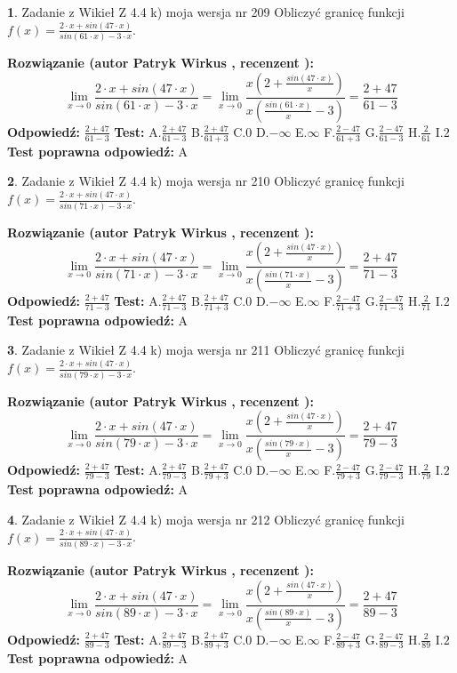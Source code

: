 \documentclass[12pt, a4paper]{article}
\theoremstyle{definition} %
\newtheorem{zad}{}
\newcommand{\zadStart}[1]{\begin{zad}#1\newline}
\newcommand{\zadStop}{\end{zad}}
\newcommand{\rozwStart}[2]{\noindent \textbf{Rozwiązanie (autor #1 , recenzent #2): }\newline}
\newcommand{\rozwStop}{\newline}
\newcommand{\odpStart}{\noindent \textbf{Odpowiedź:}\newline}
\newcommand{\odpStop}{\newline}
\newcommand{\testStart}{\noindent \textbf{Test:}\newline}
\newcommand{\testStop}{\newline}
\newcommand{\kluczStart}{\noindent \textbf{Test poprawna odpowiedź:}\newline}
\newcommand{\kluczStop}{\newline}
\begin{document}
\zadStart{Zadanie z Wikieł Z 4.4 k) moja wersja nr 209}
Obliczyć granicę funkcji $f(x)=\frac{2\cdot x +sin(47\cdot x)}{sin(61\cdot x) -3\cdot x}$.
\zadStop
\rozwStart{Patryk Wirkus}{}
$$\lim\limits_{x\to 0}\frac{2\cdot x +sin(47\cdot x)}{sin(61\cdot x) -3\cdot x}
=\lim\limits_{x\to 0}\frac{x(2+\frac{sin(47\cdot x)}{x})}{x(\frac{sin(61\cdot x)}{x}-3)}
=\frac{2+47}{61-3}$$
\rozwStop
\odpStart
$\frac{2+47}{61-3}$
\odpStop
\testStart
A.$\frac{2+47}{61-3}$
B.$\frac{2+47}{61+3}$
C.$0$
D.$-\infty$
E.$\infty$
F.$\frac{2-47}{61+3}$
G.$\frac{2-47}{61-3}$
H.$\frac{2}{61}$
I.$2$
\testStop
\kluczStart
A
\kluczStop



\zadStart{Zadanie z Wikieł Z 4.4 k) moja wersja nr 210}
Obliczyć granicę funkcji $f(x)=\frac{2\cdot x +sin(47\cdot x)}{sin(71\cdot x) -3\cdot x}$.
\zadStop
\rozwStart{Patryk Wirkus}{}
$$\lim\limits_{x\to 0}\frac{2\cdot x +sin(47\cdot x)}{sin(71\cdot x) -3\cdot x}
=\lim\limits_{x\to 0}\frac{x(2+\frac{sin(47\cdot x)}{x})}{x(\frac{sin(71\cdot x)}{x}-3)}
=\frac{2+47}{71-3}$$
\rozwStop
\odpStart
$\frac{2+47}{71-3}$
\odpStop
\testStart
A.$\frac{2+47}{71-3}$
B.$\frac{2+47}{71+3}$
C.$0$
D.$-\infty$
E.$\infty$
F.$\frac{2-47}{71+3}$
G.$\frac{2-47}{71-3}$
H.$\frac{2}{71}$
I.$2$
\testStop
\kluczStart
A
\kluczStop



\zadStart{Zadanie z Wikieł Z 4.4 k) moja wersja nr 211}
Obliczyć granicę funkcji $f(x)=\frac{2\cdot x +sin(47\cdot x)}{sin(79\cdot x) -3\cdot x}$.
\zadStop
\rozwStart{Patryk Wirkus}{}
$$\lim\limits_{x\to 0}\frac{2\cdot x +sin(47\cdot x)}{sin(79\cdot x) -3\cdot x}
=\lim\limits_{x\to 0}\frac{x(2+\frac{sin(47\cdot x)}{x})}{x(\frac{sin(79\cdot x)}{x}-3)}
=\frac{2+47}{79-3}$$
\rozwStop
\odpStart
$\frac{2+47}{79-3}$
\odpStop
\testStart
A.$\frac{2+47}{79-3}$
B.$\frac{2+47}{79+3}$
C.$0$
D.$-\infty$
E.$\infty$
F.$\frac{2-47}{79+3}$
G.$\frac{2-47}{79-3}$
H.$\frac{2}{79}$
I.$2$
\testStop
\kluczStart
A
\kluczStop



\zadStart{Zadanie z Wikieł Z 4.4 k) moja wersja nr 212}
Obliczyć granicę funkcji $f(x)=\frac{2\cdot x +sin(47\cdot x)}{sin(89\cdot x) -3\cdot x}$.
\zadStop
\rozwStart{Patryk Wirkus}{}
$$\lim\limits_{x\to 0}\frac{2\cdot x +sin(47\cdot x)}{sin(89\cdot x) -3\cdot x}
=\lim\limits_{x\to 0}\frac{x(2+\frac{sin(47\cdot x)}{x})}{x(\frac{sin(89\cdot x)}{x}-3)}
=\frac{2+47}{89-3}$$
\rozwStop
\odpStart
$\frac{2+47}{89-3}$
\odpStop
\testStart
A.$\frac{2+47}{89-3}$
B.$\frac{2+47}{89+3}$
C.$0$
D.$-\infty$
E.$\infty$
F.$\frac{2-47}{89+3}$
G.$\frac{2-47}{89-3}$
H.$\frac{2}{89}$
I.$2$
\testStop
\kluczStart
A
\kluczStop
\end{document}
